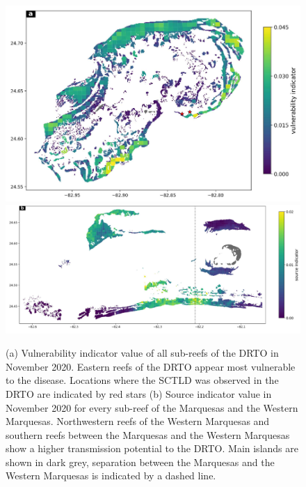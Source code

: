 \begin{figure}
    \centering
    \includegraphics[width=.75\textwidth]{chapters/drto/figures/vulnerability_new.png}
    \includegraphics[width=.99\textwidth]{chapters/drto/figures/source_new.png}
    \caption{ (a) Vulnerability indicator value of all sub-reefs of the DRTO in November 2020. Eastern reefs of the DRTO appear most vulnerable to the disease. Locations where the SCTLD was observed in the DRTO are indicated by red stars (b) Source indicator value in November 2020 for every sub-reef of the Marquesas and the Western Marquesas. Northwestern reefs of the Western Marquesas and southern reefs between the Marquesas and the Western Marquesas show a higher transmission potential to the DRTO. Main islands are shown in dark grey, separation between the Marquesas and the Western Marquesas is indicated by a dashed line.}
    \label{fig:fig4_drto}
\end{figure}


